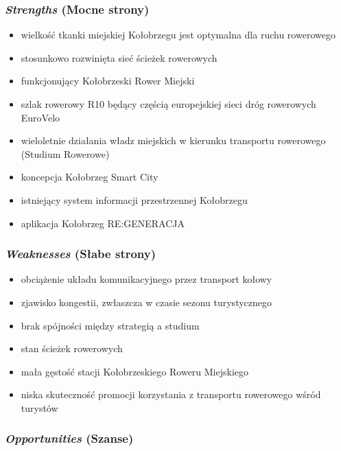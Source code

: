 \documentclass{amuthesis}
\begin{document}
\hypertarget{strengths-mocne-strony}{%
\subsubsection{\texorpdfstring{\emph{Strengths} (Mocne strony)}{Strengths (Mocne strony)}}\label{strengths-mocne-strony}}

\begin{itemize}
\item
  wielkość tkanki miejskiej Kołobrzegu jest optymalna dla ruchu rowerowego
\item
  stosunkowo rozwinięta sieć ścieżek rowerowych
\item
  funkcjonujący Kołobrzeski Rower Miejski
\item
  szlak rowerowy R10 będący częścią europejskiej sieci dróg rowerowych EuroVelo
\item
  wieloletnie działania władz miejskich w kierunku transportu rowerowego (Studium Rowerowe)
\item
  koncepcja Kołobrzeg Smart City
\item
  istniejący system informacji przestrzennej Kołobrzegu
\item
  aplikacja Kołobrzeg RE:GENERACJA
\end{itemize}

\hypertarget{weaknesses-sux142abe-strony}{%
\subsubsection{\texorpdfstring{\emph{Weaknesses} (Słabe strony)}{Weaknesses (Słabe strony)}}\label{weaknesses-sux142abe-strony}}

\begin{itemize}
\item
  obciążenie układu komunikacyjnego przez transport kołowy
\item
  zjawisko kongestii, zwłaszcza w czasie sezonu turystycznego
\item
  brak spójności między strategią a studium
\item
  stan ścieżek rowerowych
\item
  mała gęstość stacji Kołobrzeskiego Roweru Miejskiego
\item
  niska skuteczność promocji korzystania z transportu rowerowego wśród turystów
\end{itemize}

\hypertarget{opportunities-szanse}{%
\subsubsection{\texorpdfstring{\emph{Opportunities} (Szanse)}{Opportunities (Szanse)}}\label{opportunities-szanse}}
\end{document}
